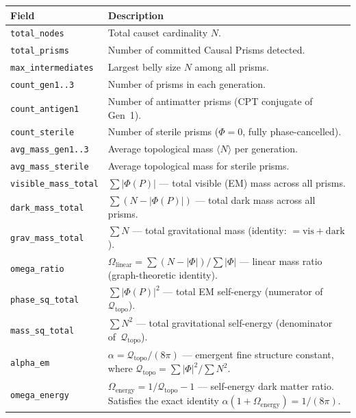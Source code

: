 \documentclass[11pt, a4paper, openany]{book}
\newcommand{\code}[1]{\texttt{#1}}
\begin{document}
\begin{table}[H]
\centering
\begin{tabular}{@{} l p{9cm} @{}}
\toprule
\textbf{Field} & \textbf{Description} \\
\midrule
\code{total\_nodes}         & Total causet cardinality $N$. \\
\code{total\_prisms}        & Number of committed Causal Prisms detected. \\
\code{max\_intermediates}   & Largest belly size $N$ among all prisms. \\
\code{count\_gen1..3}       & Number of prisms in each generation. \\
\code{count\_antigen1}      & Number of antimatter prisms (CPT conjugate of Gen~1). \\
\code{count\_sterile}       & Number of sterile prisms ($\Phi = 0$, fully phase-cancelled). \\
\code{avg\_mass\_gen1..3}   & Average topological mass $\langle N \rangle$ per generation. \\
\code{avg\_mass\_sterile}   & Average topological mass for sterile prisms. \\
\code{visible\_mass\_total} & $\sum|\Phi(P)|$ --- total visible (EM) mass across all prisms. \\
\code{dark\_mass\_total}    & $\sum(N - |\Phi(P)|)$ --- total dark mass across all prisms. \\
\code{grav\_mass\_total}    & $\sum N$ --- total gravitational mass (identity: $= \text{vis} + \text{dark}$). \\
\code{omega\_ratio}         & $\Omega_{\mathrm{linear}} = \sum(N - |\Phi|) / \sum|\Phi|$ --- linear mass ratio (graph-theoretic identity). \\
\code{phase\_sq\_total}     & $\sum|\Phi(P)|^2$ --- total EM self-energy (numerator of~$\mathcal{Q}_{\mathrm{topo}}$). \\
\code{mass\_sq\_total}      & $\sum N^2$ --- total gravitational self-energy (denominator of~$\mathcal{Q}_{\mathrm{topo}}$). \\
\code{alpha\_em}            & $\alpha = \mathcal{Q}_{\mathrm{topo}} / (8\pi)$ --- emergent fine structure constant, where $\mathcal{Q}_{\mathrm{topo}} = \sum|\Phi|^2/\sum N^2$. \\
\code{omega\_energy}        & $\Omega_{\mathrm{energy}} = 1/\mathcal{Q}_{\mathrm{topo}} - 1$ --- self-energy dark matter ratio. Satisfies the exact identity $\alpha(1 + \Omega_{\mathrm{energy}}) = 1/(8\pi)$. \\

\end{tabular}
\end{table}
\end{document}
